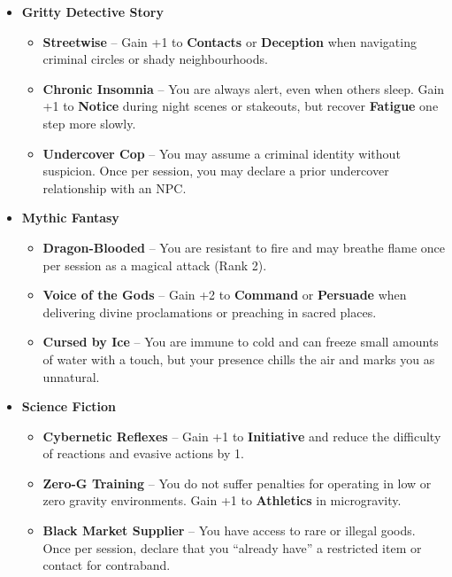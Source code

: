 \begin{itemize}
    \item \textbf{Gritty Detective Story}
    \begin{itemize}
        \item \textbf{Streetwise} – Gain +1 to \textbf{Contacts} or \textbf{Deception} when navigating criminal circles or shady neighbourhoods.
        \item \textbf{Chronic Insomnia} – You are always alert, even when others sleep. Gain +1 to \textbf{Notice} during night scenes or stakeouts, but recover \textbf{Fatigue} one step more slowly.
        \item \textbf{Undercover Cop} – You may assume a criminal identity without suspicion. Once per session, you may declare a prior undercover relationship with an NPC.
    \end{itemize}

    \item \textbf{Mythic Fantasy}
    \begin{itemize}
        \item \textbf{Dragon-Blooded} – You are resistant to fire and may breathe flame once per session as a magical attack (Rank 2).
        \item \textbf{Voice of the Gods} – Gain +2 to \textbf{Command} or \textbf{Persuade} when delivering divine proclamations or preaching in sacred places.
        \item \textbf{Cursed by Ice} – You are immune to cold and can freeze small amounts of water with a touch, but your presence chills the air and marks you as unnatural.
    \end{itemize}

    \item \textbf{Science Fiction}
    \begin{itemize}
        \item \textbf{Cybernetic Reflexes} – Gain +1 to \textbf{Initiative} and reduce the difficulty of reactions and evasive actions by 1.
        \item \textbf{Zero-G Training} – You do not suffer penalties for operating in low or zero gravity environments. Gain +1 to \textbf{Athletics} in microgravity.
        \item \textbf{Black Market Supplier} – You have access to rare or illegal goods. Once per session, declare that you “already have” a restricted item or contact for contraband.
    \end{itemize}
\end{itemize}

